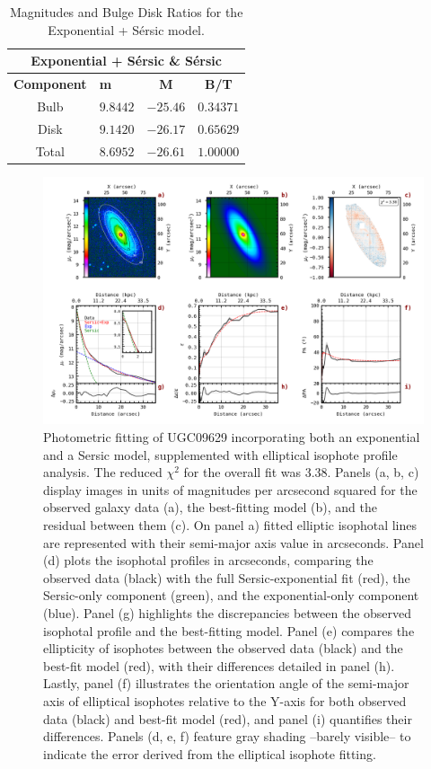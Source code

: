 \begin{table}[!htb]
    \centering
    \begin{tabular}{|c|l|c|c|}
        \hline
        \multicolumn{4}{|c|}{\textbf{Exponential + Sérsic \& Sérsic}} \\
        \hline
        \textbf{Component} & \textbf{m} & \textbf{M} & \textbf{B/T} \\
        \hline
        Bulb & \(9.8442\) & \(-25.46\) & \(0.34371\) \\
        \hline
        Disk & \(9.1420\) & \(-26.17\) & \(0.65629\) \\
        \hline
        Total & \(8.6952\) & \(-26.61\) & \(1.00000\) \\
        \hline
    \end{tabular}
    \caption{Magnitudes and Bulge Disk Ratios for the Exponential + Sérsic model. }
\end{table}


\begin{figure}[h!]
  \centering
  \includegraphics[width=\textwidth]{images/fit_sersic_exp.png}
\caption{\small Photometric fitting of UGC09629 incorporating both an exponential and a Sersic model, supplemented with elliptical isophote profile analysis. The reduced $\chi^2$ for the overall fit was 3.38. Panels (a, b, c) display images in units of magnitudes per arcsecond squared for the observed galaxy data (a), the best-fitting model (b), and the residual between them (c). On panel a) fitted elliptic isophotal lines are represented with their semi-major axis value in arcseconds. Panel (d) plots the isophotal profiles in arcseconds, comparing the observed data (black) with the full Sersic-exponential fit (red), the Sersic-only component (green), and the exponential-only component (blue). Panel (g) highlights the discrepancies between the observed isophotal profile and the best-fitting model. Panel (e) compares the ellipticity of isophotes between the observed data (black) and the best-fit model (red), with their differences detailed in panel (h). Lastly, panel (f) illustrates the orientation angle of the semi-major axis of elliptical isophotes relative to the Y-axis for both observed data (black) and best-fit model (red), and panel (i) quantifies their differences. Panels (d, e, f) feature gray shading --barely visible-- to indicate the error derived from the elliptical isophote fitting.}
  \label{fig:your_label}
\end{figure}

